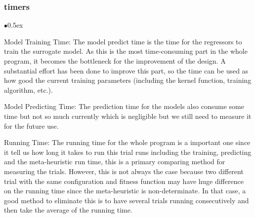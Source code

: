 \documentclass[11pt, runningheads,a4paper]{llncs}
\begin{document}
\subsubsection{timers}
\begin{list}{$\bullet$}{\itemsep 0.5ex}
\item Model Training Time: The model predict time is the time for the regressors to train the surrogate model. As this is the most time-consuming part in the whole program, it becomes the bottleneck for the improvement of the design. A substantial effort has been done to improve this part, so the time can be used as how good the current training parameters (including the kernel function, training algorithm, etc.).
\item Model Predicting Time: The prediction time for the models also consume some time but not so much currently which is negligible but we still need to measure it for the future use.
\item Running Time: The running time for the whole program is a important one since it tell us how long it takes to run this trial runs including the training, predicting and the meta-heuristic run time, this is a primary comparing method for measuring the trials. However, this is not always the case because two different trial with the same configuration and fitness function may have huge difference on the running time since the meta-heuristic is non-determinate. In that case, a good method to eliminate this is to have several trials running consecutively and then take the average of the running time.
\end{list}
\end{document}
